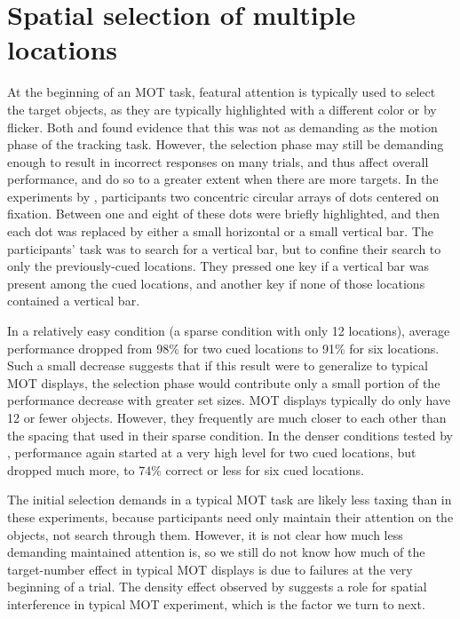 \documentclass[]{book}
\begin{document}
\hypertarget{spatial-selection-of-multiple-locations}{%
\section{Spatial selection of multiple locations}\label{spatial-selection-of-multiple-locations}}

At the beginning of an MOT task, featural attention is typically used to select the target objects, as they are typically highlighted with a different color or by flicker. Both \citet{drewNeuralMeasuresIndividual2008} and \citet{franconeriHowManyLocations2007} found evidence that this was not as demanding as the motion phase of the tracking task. However, the selection phase may still be demanding enough to result in incorrect responses on many trials, and thus affect overall performance, and do so to a greater extent when there are more targets.
In the experiments by \citet{franconeriHowManyLocations2007}, participants two concentric circular arrays of dots centered on fixation. Between one and eight of these dots were briefly highlighted, and then each dot was replaced by either a small horizontal or a small vertical bar. The participants' task was to search for a vertical bar, but to confine their search to only the previously-cued locations. They pressed one key if a vertical bar was present among the cued locations, and another key if none of those locations contained a vertical bar.

In a relatively easy condition (a sparse condition with only 12 locations), average performance dropped from 98\% for two cued locations to 91\% for six locations. Such a small decrease suggests that if this result were to generalize to typical MOT displays, the selection phase would contribute only a small portion of the performance decrease with greater set sizes. MOT displays typically do only have 12 or fewer objects. However, they frequently are much closer to each other than the spacing that \citet{franconeriHowManyLocations2007} used in their sparse condition. In the denser conditions tested by \citet{franconeriHowManyLocations2007}, performance again started at a very high level for two cued locations, but dropped much more, to 74\% correct or less for six cued locations.

The initial selection demands in a typical MOT task are likely less taxing than in these experiments, because participants need only maintain their attention on the objects, not search through them. However, it is not clear how much less demanding maintained attention is, so we still do not know how much of the target-number effect in typical MOT displays is due to failures at the very beginning of a trial. The density effect observed by \citet{franconeriHowManyLocations2007} suggests a role for spatial interference in typical MOT experiment, which is the factor we turn to next.
\end{document}
